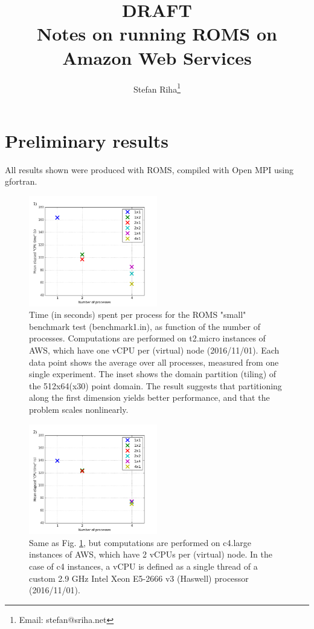 \documentclass[12pt,a4paper]{article}
\title{
	{\bf DRAFT}\\
	Notes on running ROMS on Amazon Web Services 
}
\author{Stefan Riha\thanks{Email: stefan@sriha.net}}
\begin{document}
	\setlength{\parindent}{0cm}
	\maketitle

\section{Preliminary results}
	All results shown were produced with ROMS, compiled with Open MPI using gfortran.
	
	\begin{figure}[H]
		\centering
		\includegraphics[width=0.5\textwidth]{met_t2micro.png}
		\caption{Time (in seconds) spent per process for the ROMS "small" benchmark test (benchmark1.in), as function of the number of processes. Computations are performed on t2.micro instances of AWS, which have one vCPU per (virtual) node (2016/11/01). Each data point shows the average over all processes, measured from one single experiment. The inset shows the domain partition (tiling) of the 512x64(x30) point domain. The result suggests that partitioning along the first dimension yields better performance, and that the problem scales nonlinearly.}
		\label{fig:met_t2micro}
	\end{figure}

	\begin{figure}[H]
	\centering
	\includegraphics[width=0.5\textwidth]{met_c4large.png}
	\caption{Same as Fig. \ref{fig:met_t2micro}, but computations are performed on c4.large instances of AWS, which have 2 vCPUs per (virtual) node. In the case of c4 instances, a vCPU is defined as a single thread of a custom 2.9 GHz Intel Xeon E5-2666 v3 (Haswell) processor (2016/11/01).}
	\label{fig:met_c4large}
\end{figure}
	
%	
%	
	
\end{document}
